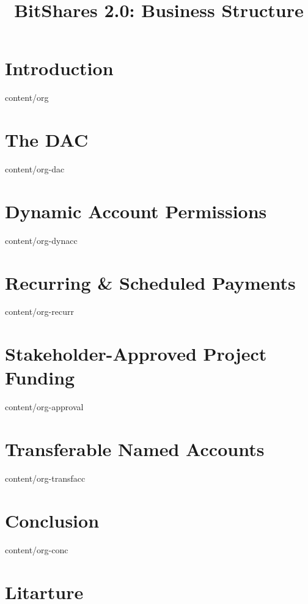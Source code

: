 \documentclass[conference,final,10pt,a4paper]{IEEEtran}
\title{BitShares 2.0: Business Structure}
\author{}
\begin{document}
\sloppy
\maketitle

\begin{abstract}
\end{abstract}
\section  { Introduction                         }  { content/org           } 
\section  { The DAC                              }  { content/org-dac       }
\section  { Dynamic Account Permissions          }  { content/org-dynacc    } 
\section  { Recurring \& Scheduled Payments      }  { content/org-recurr    } 
\section  { Stakeholder-Approved Project Funding }  { content/org-approval  } 
\section  { Transferable Named Accounts          }  { content/org-transfacc } 
\section  { Conclusion                           }  { content/org-conc      } 
\section* { Litarture                            } 
\end{document}
